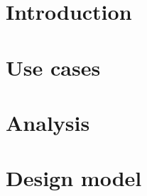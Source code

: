 \documentclass[a4paper,11pt]{article}
\begin{document}
	

	\tableofcontents
	\newpage

	\section{Introduction}
	
	\newpage
	
	\section{Use cases}
	
	\newpage
	
	\section{Analysis}
	
	\newpage
	
	\section{Design model}
	
	\newpage
	
\end{document}
